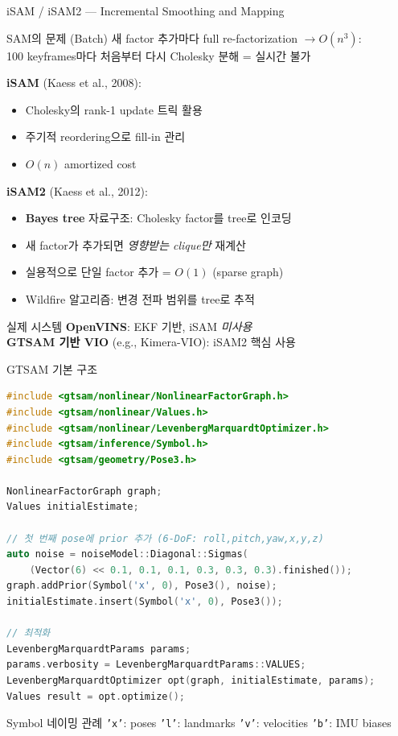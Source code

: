 \begin{frame}{iSAM / iSAM2 — Incremental Smoothing and Mapping}
  \begin{block}{SAM의 문제 (Batch)}
    새 factor 추가마다 full re-factorization $\to O(n^3)$:\\
    100 keyframes마다 처음부터 다시 Cholesky 분해 = 실시간 불가
  \end{block}
  \pause
  \textbf{iSAM} (Kaess et al., 2008):
  \begin{itemize}
    \item Cholesky의 rank-1 update 트릭 활용
    \item 주기적 reordering으로 fill-in 관리
    \item $O(n)$ amortized cost
  \end{itemize}
  \pause
  \textbf{iSAM2} (Kaess et al., 2012):
  \begin{itemize}
    \item \textbf{Bayes tree} 자료구조: Cholesky factor를 tree로 인코딩
    \item 새 factor가 추가되면 \emph{영향받는 clique만} 재계산
    \item 실용적으로 단일 factor 추가 = $O(1)$ (sparse graph)
    \item Wildfire 알고리즘: 변경 전파 범위를 tree로 추적
  \end{itemize}
  \pause
  \begin{alertblock}{실제 시스템}
    \textbf{OpenVINS}: EKF 기반, iSAM \emph{미사용}\\
    \textbf{GTSAM 기반 VIO} (e.g., Kimera-VIO): iSAM2 핵심 사용
  \end{alertblock}
\end{frame}

\begin{frame}[fragile]{GTSAM 기본 구조}
  \begin{lstlisting}[language=C++]
#include <gtsam/nonlinear/NonlinearFactorGraph.h>
#include <gtsam/nonlinear/Values.h>
#include <gtsam/nonlinear/LevenbergMarquardtOptimizer.h>
#include <gtsam/inference/Symbol.h>
#include <gtsam/geometry/Pose3.h>

NonlinearFactorGraph graph;
Values initialEstimate;

// 첫 번째 pose에 prior 추가 (6-DoF: roll,pitch,yaw,x,y,z)
auto noise = noiseModel::Diagonal::Sigmas(
    (Vector(6) << 0.1, 0.1, 0.1, 0.3, 0.3, 0.3).finished());
graph.addPrior(Symbol('x', 0), Pose3(), noise);
initialEstimate.insert(Symbol('x', 0), Pose3());

// 최적화
LevenbergMarquardtParams params;
params.verbosity = LevenbergMarquardtParams::VALUES;
LevenbergMarquardtOptimizer opt(graph, initialEstimate, params);
Values result = opt.optimize();
  \end{lstlisting}
  \begin{block}{Symbol 네이밍 관례}
    \texttt{'x'}: poses \quad \texttt{'l'}: landmarks \quad
    \texttt{'v'}: velocities \quad \texttt{'b'}: IMU biases
  \end{block}
\end{frame}

